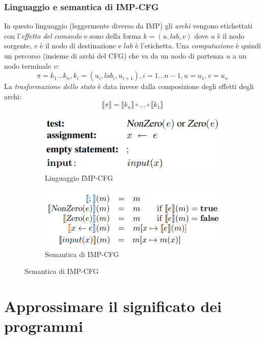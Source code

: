 \documentclass[a4paper,oneside,titlepage]{book}
\begin{document}
\subsection{Linguaggio e semantica di IMP-CFG}
In questo linguaggio (leggermente diverso da IMP) gli \textit{archi} vengono etichettati con l'\textit{effetto del comando} e sono della forma $k = (u, lab, v)$ dove $u$ è il nodo sorgente, $v$ è il nodo di destinazione e $lab$ è l'etichetta. Una \textit{computazione} è quindi un percorso (insieme di archi del CFG) che va da un nodo di partenza $u$ a un nodo terminale $v$:
\[
    \pi = k_1 ... k_n, k_i = (u_i, lab_i, u_{i+1}), i = 1 ... n-1, u = u_1, v = u_n
\]
La \textit{trasformazione dello stato} è data invece dalla composizione degli effetti degli archi:
\[
	\llbracket \pi \rrbracket = \llbracket k_n \rrbracket \circ ... \circ \llbracket k_1 \rrbracket
\]
\begin{figure}[htp]
	\begin{subfigure}{0.49\textwidth}
	    \centering
		\includegraphics[width=\textwidth, height=\textheight, keepaspectratio]{impCfgLang.png}
		\caption{Linguaggio IMP-CFG}
	\end{subfigure}
	\hfill
	\begin{subfigure}{0.49\textwidth}
	    \centering
		\includegraphics[width=\textwidth, height=\textheight, keepaspectratio]{impCfgSem.png} 
		\caption{Semantica di IMP-CFG}
	\end{subfigure}
\end{figure}


\chapter{Approssimare il significato dei programmi}
\end{document}
